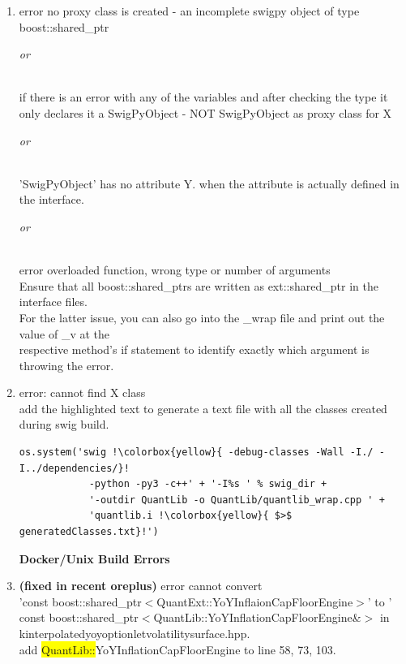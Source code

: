 \documentclass[10pt]{article}
\begin{document}
\begin{enumerate}
    \item error no proxy class is created - an incomplete swigpy object of type boost::shared\_ptr\\
        \centerline{ \textit{or} } \\
    if there is an error with any of the variables and after checking the type it only declares it a SwigPyObject - NOT SwigPyObject as proxy class for X \\
        \centerline{ \textit{or} } \\
    'SwigPyObject' has no attribute Y. when the attribute is actually defined in the interface. \\
        \centerline{ \textit{or} } \\
    error overloaded function, wrong type or number of arguments \\
    \-\hspace{1cm} Ensure that all boost::shared\_ptrs are written as ext::shared\_ptr in the interface files. \\
    \-\hspace{1cm} For the latter issue, you can also go into the \_wrap file and print out the value of \_v at the \\ \-\hspace{1cm}respective method's if statement to identify exactly which argument is throwing the error.

    \item error: cannot find X class \\
    \-\hspace{1cm} add the highlighted text to generate a text file with all the classes created during swig build.
    \begin{lstlisting}[escapeinside ={\%,}, escapechar={!}]
            os.system('swig !\colorbox{yellow}{ -debug-classes -Wall -I./ -I../dependencies/}!
            -python -py3 -c++' + '-I%s ' % swig_dir +
            '-outdir QuantLib -o QuantLib/quantlib_wrap.cpp ' +
            'quantlib.i !\colorbox{yellow}{ $>$  generatedClasses.txt}!')
    \end{lstlisting}

    \textbf{Docker/Unix Build Errors}
    \item \textbf{(fixed in recent oreplus)} error cannot convert \\ 'const boost::shared\_ptr$<$QuantExt::YoYInflaionCapFloorEngine$>$' to '\\ const boost::shared\_ptr$<$QuantLib::YoYInflationCapFloorEngine\&$>$ in \\ kinterpolatedyoyoptionletvolatilitysurface.hpp.\\
    \-\hspace{1cm} add \colorbox{yellow}{QuantLib::}YoYInflationCapFloorEngine to line 58, 73, 103.\\


\end{enumerate}
\end{document}
